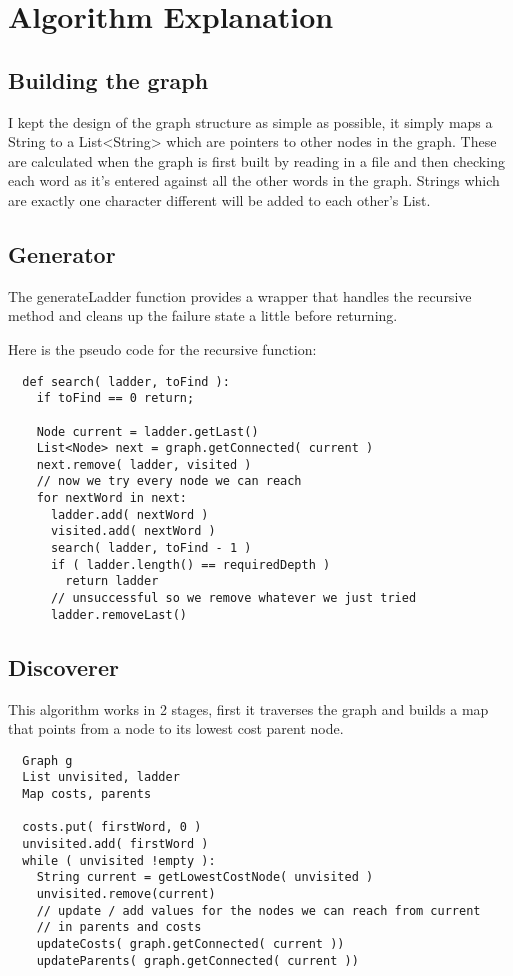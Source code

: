 \documentclass[12pt, titlepage, a4paper, oneside]{article}
\begin{document}
\section*{Algorithm Explanation}

\subsection*{Building the graph}
I kept the design of the graph structure as simple as possible, it simply maps
a String to a List<String> which are pointers to other nodes in the graph. These
are calculated when the graph is first built by reading in a file and then checking
each word as it's entered against all the other words in the graph. Strings which
are exactly one character different will be added to each other's List.

\subsection*{Generator}
The generateLadder function provides a wrapper that handles the recursive method
and cleans up the failure state a little before returning.

Here is the pseudo code for the recursive function:
\begin{verbatim}
  def search( ladder, toFind ):
    if toFind == 0 return;

    Node current = ladder.getLast()
    List<Node> next = graph.getConnected( current )
    next.remove( ladder, visited )
    // now we try every node we can reach
    for nextWord in next:
      ladder.add( nextWord )
      visited.add( nextWord )
      search( ladder, toFind - 1 )
      if ( ladder.length() == requiredDepth )
        return ladder
      // unsuccessful so we remove whatever we just tried
      ladder.removeLast() 
\end{verbatim}

\subsection*{Discoverer}
This algorithm works in 2 stages, first it traverses the graph and builds a map
that points from a node to its lowest cost parent node.
\begin{verbatim}
  Graph g
  List unvisited, ladder
  Map costs, parents

  costs.put( firstWord, 0 )
  unvisited.add( firstWord )
  while ( unvisited !empty ):
    String current = getLowestCostNode( unvisited )
    unvisited.remove(current)
    // update / add values for the nodes we can reach from current
    // in parents and costs
    updateCosts( graph.getConnected( current ))
    updateParents( graph.getConnected( current ))
\end{verbatim}
\end{document}
